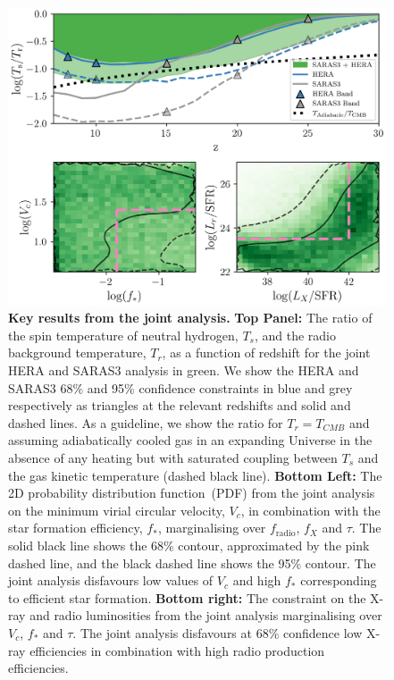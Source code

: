 \begin{figure}
    \centering
    \includegraphics{joint_constraints/figs/TS_figure_4.png}
    \caption{\textbf{Key results from the joint analysis.} \textbf{Top Panel:} The ratio of the spin temperature of neutral hydrogen, $T_s$, and the radio background temperature, $T_r$, as a function of redshift for the joint HERA and SARAS3 analysis in green. We show the HERA and SARAS3 68\% and 95\% confidence constraints in blue and grey respectively as triangles at the relevant redshifts and solid and dashed lines. 
    As a guideline, we show the ratio for $T_r = T_{CMB}$ and assuming adiabatically cooled gas in an expanding Universe in the absence of any heating but with saturated coupling between $T_s$ and the gas kinetic temperature (dashed black line). 
    \textbf{Bottom Left:} The 2D probability distribution function~(PDF) from the joint analysis on the minimum virial circular velocity, $V_c$, in combination with the star formation efficiency, $f_*$, marginalising over $f_\mathrm{radio}$, $f_X$ and $\tau$. The solid black line shows the 68\% contour, approximated by the pink dashed line, and the black dashed line shows the 95\% contour. The joint analysis disfavours low values of $V_c$ and high $f_*$ corresponding to efficient star formation. \textbf{Bottom right:} The constraint on the X-ray and radio luminosities from the joint analysis marginalising over $V_c$, $f_*$ and $\tau$. The joint analysis disfavours at 68\% confidence low X-ray efficiencies in combination with high radio production efficiencies.}
    \label{fig:igm_params}
\end{figure}

